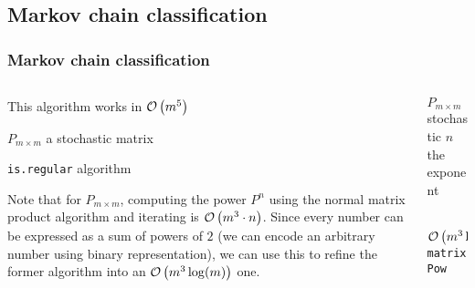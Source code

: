 \subsection{Markov chain classification}
 \begin{frame}\frametitle{Markov chain classification}
    \vspace{3em}
    \begin{columns}
    \begin{column}{0.6\textwidth}
        This algorithm works in \(\mathcal{O}\left(m^5\right)\)

        \begin{algorithm}[H]
        \begin{algorithmic}[1]
        \REQUIRE $P_{m \times m}$ a stochastic matrix
        \NEWLINE
        \ELSE
        \ENDIF
        \end{algorithmic}
        \caption{\small\texttt{is.regular} algorithm}
        \label{alg:isRegular}
        \end{algorithm}
    
        Note that for \(P_{m\times m}\), computing the power \(P^n\) using the normal 
        matrix product algorithm and iterating is \(\mathcal{O}\left(m^3 \cdot n\right)\). Since 
        every number can be expressed as a sum of powers of \(2\) (we can encode an 
        arbitrary number using binary representation), we can use this to refine the 
        former algorithm into an \(\mathcal{O}\left(m^3 \log(m)\right)\) one.
    \end{column}
    \begin{column}{0.4\textwidth}
        \begin{algorithm}[H]
        \begin{algorithmic}[1]
        \REQUIRE $P_{m \times m}$ stochastic
        \REQUIRE $n$ the exponent
        \NEWLINE
            \ENDIF
        \ENDWHILE
        \end{algorithmic}
        \caption{\qquad\\$\mathcal{O}\left(m^3\log(n)\right)$ \small\texttt{matrixPow}}
        \label{alg:matrixPow}
        \end{algorithm}
    \end{column}
    \end{columns}
\end{frame}
